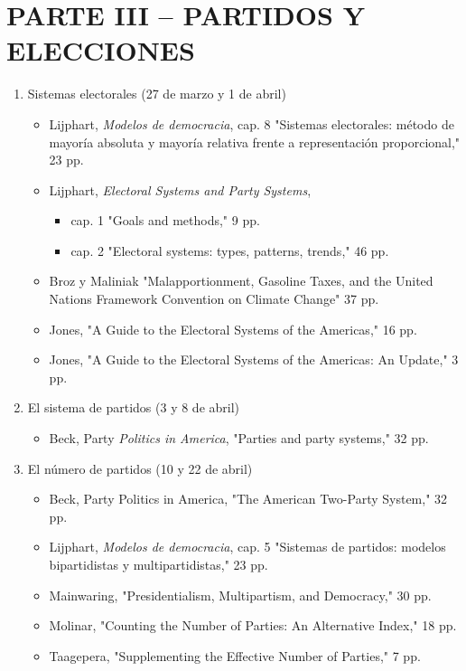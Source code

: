 \documentclass{article}
\begin{document}
\section{PARTE III – PARTIDOS Y ELECCIONES}
\label{sec:orga5b0cdb}
\begin{enumerate}
\item Sistemas electorales  (27 de marzo y 1 de abril)
\label{sec:orgb937479}
\begin{itemize}
\item Lijphart, \emph{Modelos de democracia}, cap. 8 "Sistemas electorales: método de mayoría absoluta y mayoría relativa frente a representación proporcional," 23 pp.
\item Lijphart, \emph{Electoral Systems and Party Systems}, 
\begin{itemize}
\item cap. 1 "Goals and methods," 9 pp.
\item cap. 2 "Electoral systems: types, patterns, trends," 46 pp.
\end{itemize}
\item Broz y Maliniak "Malapportionment, Gasoline Taxes, and the United Nations Framework Convention on Climate Change" 37 pp.
\item Jones, "A Guide to the Electoral Systems of the Americas," 16 pp.
\item Jones, "A Guide to the Electoral Systems of the Americas: An Update," 3 pp.
\end{itemize}
\item El sistema de partidos  (3 y 8 de abril)
\label{sec:org72290c5}
\begin{itemize}
\item Beck, Party \emph{Politics in America}, "Parties and party systems," 32 pp.
\end{itemize}
\item El número de partidos  (10 y 22 de abril)
\label{sec:org9fce3e5}
\begin{itemize}
\item Beck, Party Politics in America, "The American Two-Party System," 32 pp.
\item Lijphart, \emph{Modelos de democracia}, cap. 5 "Sistemas de partidos: modelos bipartidistas y multipartidistas," 23 pp.
\item Mainwaring, "Presidentialism, Multipartism, and Democracy," 30 pp.
\item Molinar, "Counting the Number of Parties: An Alternative Index," 18 pp.
\item Taagepera, "Supplementing the Effective Number of Parties," 7 pp.

\end{itemize}
\end{enumerate}
\end{document}
